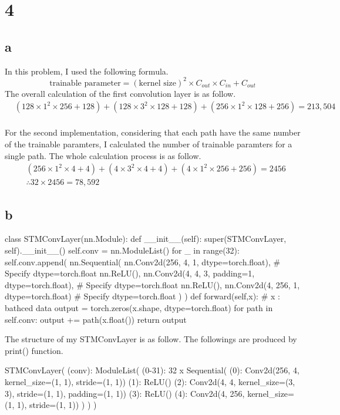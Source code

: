 \documentclass[10pt]{article}
\begin{document}
\section*{4}
\subsection*{a}
In this problem, I used the following formula.
\begin{equation*}
    \text{trainable parameter} = (\text{kernel size})^2 \times C_{out} \times C_{in} + C_{out}
\end{equation*}
The overall calculation of the first convolution layer is as follow.
\begin{align*}
    &(128\times 1^2 \times 256 + 128) + (128 \times 3^2 \times 128 + 128) + (256\times 1^2 \times 128 + 256) = 213,504 \\
\end{align*}

For the second implementation, considering that each path have the same number of the trainable paramters, I calculated the number of trainable paramters for a single path. 
The whole calculation process is as follow.
\begin{align*}
    &(256\times 1^2 \times 4 + 4) + (4 \times 3^2 \times 4 + 4) + (4\times 1^2 \times 256 + 256) = 2456 \\
    &\therefore 32\times 2456 = 78,592
\end{align*}
\subsection*{b}
\begin{python}
class STMConvLayer(nn.Module):
    def __init__(self):
        super(STMConvLayer, self).__init__()
        self.conv = nn.ModuleList()
        for _ in range(32):
            self.conv.append(
                nn.Sequential(
                    nn.Conv2d(256, 4, 1, dtype=torch.float),  # Specify dtype=torch.float
                    nn.ReLU(),
                    nn.Conv2d(4, 4, 3, padding=1, dtype=torch.float),  # Specify dtype=torch.float
                    nn.ReLU(),
                    nn.Conv2d(4, 256, 1, dtype=torch.float)  # Specify dtype=torch.float
                )
            )
    def forward(self,x): # x : bathced data
        output = torch.zeros(x.shape, dtype=torch.float)
        for path in self.conv:
            output += path(x.float())
        return output
\end{python}
The structure of my STMConvLayer is as follow. The followings are produced by print() function.
\begin{python}
STMConvLayer(
  (conv): ModuleList(
    (0-31): 32 x Sequential(
      (0): Conv2d(256, 4, kernel_size=(1, 1), stride=(1, 1))
      (1): ReLU()
      (2): Conv2d(4, 4, kernel_size=(3, 3), stride=(1, 1), padding=(1, 1))
      (3): ReLU()
      (4): Conv2d(4, 256, kernel_size=(1, 1), stride=(1, 1))
    )
  )
)
\end{python}
\end{document}
